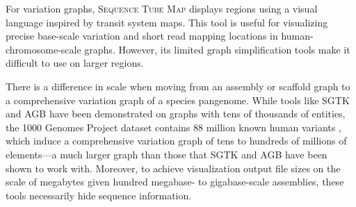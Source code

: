 
For variation graphs, \textsc{Sequence Tube Map} \cite{Beyer_2019} displays regions using a visual language inspired by transit system maps.
This tool is useful for visualizing precise base-scale variation and short read mapping locations in human-chromosome-scale graphs.
However, its limited graph simplification tools make it difficult to use on larger regions.

There is a difference in scale when moving from an assembly or scaffold graph to a comprehensive variation graph of a species pangenome.
While tools like \textsc{SGTK} and \textsc{AGB} have been demonstrated on graphs with tens of thousands of entities, the 1000 Genomes Project dataset contains 88 million known human variants \citep{1000_2015}, which induce a comprehensive variation graph of tens to hundreds of millions of elements---a much larger graph than those that SGTK and AGB have been shown to work with.
Moreover, to achieve visualization output file sizes on the scale of megabytes given hundred megabase- to gigabase-scale assemblies, these tools necessarily hide sequence information.




